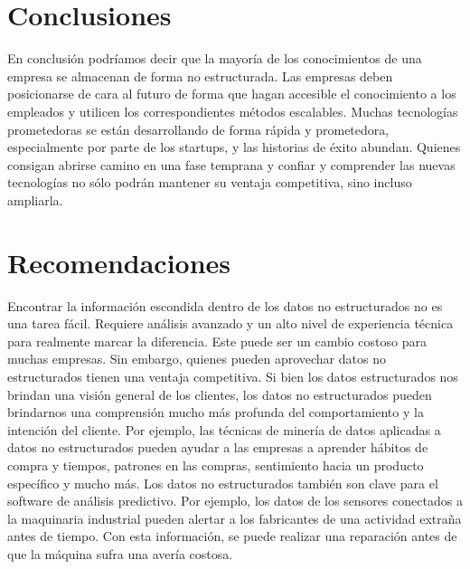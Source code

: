 \documentclass[twoside,twocolumn]{article}
\begin{document}
\section{Conclusiones}
En conclusión podríamos decir que la mayoría de los 
conocimientos de una empresa se almacenan de forma no 
estructurada. Las empresas deben posicionarse de cara al 
futuro de forma que hagan accesible el conocimiento a los empleados y 
utilicen los correspondientes métodos escalables. Muchas tecnologías
 prometedoras se están desarrollando de forma rápida y prometedora, 
 especialmente por parte de los startups, y las historias de éxito abundan.
  Quienes consigan abrirse camino en una fase temprana y confiar y comprender
   las nuevas tecnologías no sólo 
podrán mantener su ventaja competitiva, sino incluso ampliarla.
\section{Recomendaciones}
Encontrar la información escondida dentro de los datos no 
estructurados no es una tarea fácil. Requiere análisis avanzado 
y un alto nivel de experiencia técnica para realmente marcar la diferencia. Este puede ser un cambio costoso para muchas empresas.
Sin embargo, quienes pueden aprovechar datos no estructurados
 tienen una ventaja competitiva. Si bien los datos estructurados 
 nos brindan una visión general de los clientes, los datos no
  estructurados pueden brindarnos una comprensión mucho más profunda del comportamiento y la intención del cliente.
Por ejemplo, las técnicas de minería de datos aplicadas a datos 
no estructurados pueden ayudar a las empresas a aprender hábitos 
de compra y tiempos, patrones en las compras, sentimiento hacia un 
producto específico y mucho más.
Los datos no estructurados también son clave para el software de 
análisis predictivo. Por ejemplo, los datos de los sensores conectados 
a la maquinaria industrial pueden alertar a los fabricantes de una actividad 
extraña antes de tiempo. Con esta información, se puede realizar una reparación 
antes de que la máquina sufra una avería costosa.

\end{document}
